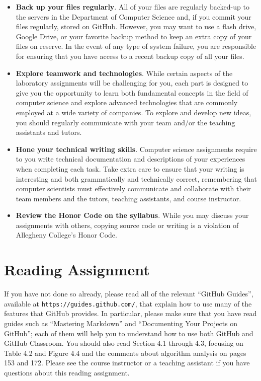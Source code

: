 \documentclass[11pt]{article}
\newcommand{\url}[1]{\lstinline{#1}}
\begin{document}
\begin{itemize}
\item {\bf Back up your files regularly}. All of your files are regularly backed-up to the servers in the Department of
  Computer Science and, if you commit your files regularly, stored on GitHub. However, you may want to use a flash
  drive, Google Drive, or your favorite backup method to keep an extra copy of your files on reserve. In the event of
  any type of system failure, you are responsible for ensuring that you have access to a recent backup copy of all your
  files.

\item {\bf Explore teamwork and technologies}. While certain aspects of the laboratory assignments will be challenging
  for you, each part is designed to give you the opportunity to learn both fundamental concepts in the field of computer
  science and explore advanced technologies that are commonly employed at a wide variety of companies. To explore and
  develop new ideas, you should regularly communicate with your team and/or the teaching assistants and tutors.

\item {\bf Hone your technical writing skills}. Computer science assignments require to you write technical
  documentation and descriptions of your experiences when completing each task. Take extra care to ensure that your
  writing is interesting and both grammatically and technically correct, remembering that computer scientists must
  effectively communicate and collaborate with their team members and the tutors, teaching assistants, and course
  instructor.

\item {\bf Review the Honor Code on the syllabus}. While you may discuss your assignments with others, copying source
  code or writing is a violation of Allegheny College's Honor Code.

\end{itemize}

\section*{Reading Assignment}

If you have not done so already, please read all of the relevant ``GitHub
Guides'', available at \url{https://guides.github.com/}, that explain how to use
many of the features that GitHub provides. In particular, please make sure that
you have read guides such as ``Mastering Markdown'' and ``Documenting Your
Projects on GitHub''; each of them will help you to understand how to use both
GitHub and GitHub Classroom. You should also read Section 4.1 through 4.3,
focusing on Table 4.2 and Figure 4.4 and the comments about algorithm analysis
on pages 153 and 172. Please see the course instructor or a teaching assistant
if you have questions about this reading assignment.
\end{document}
